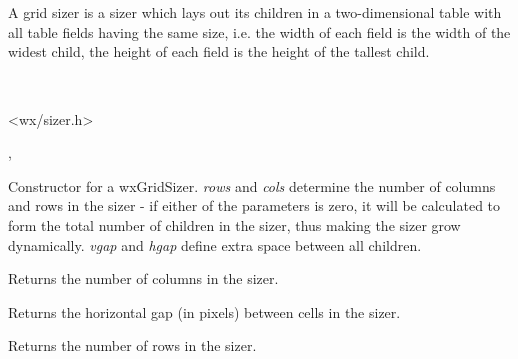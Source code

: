 \section{}\label{wxgridsizer}

A grid sizer is a sizer which lays out its children in a two-dimensional
table with all table fields having the same size,
i.e. the width of each field is the width of the widest child,
the height of each field is the height of the tallest child.


\\


<wx/sizer.h>


, 

\label{wxgridsizerwxgridsizer}



Constructor for a wxGridSizer. {\it rows} and {\it cols} determine the number of
columns and rows in the sizer - if either of the parameters is zero, it will be
calculated to form the total number of children in the sizer, thus making the
sizer grow dynamically. {\it vgap} and {\it hgap} define extra space between
all children.

\label{wxgridsizergetcols}


Returns the number of columns in the sizer.


\label{wxgridsizergethgap}


Returns the horizontal gap (in pixels) between cells in the sizer.


\label{wxgridsizergetrows}


Returns the number of rows in the sizer.


\label{wxgridsizergetvgap}

